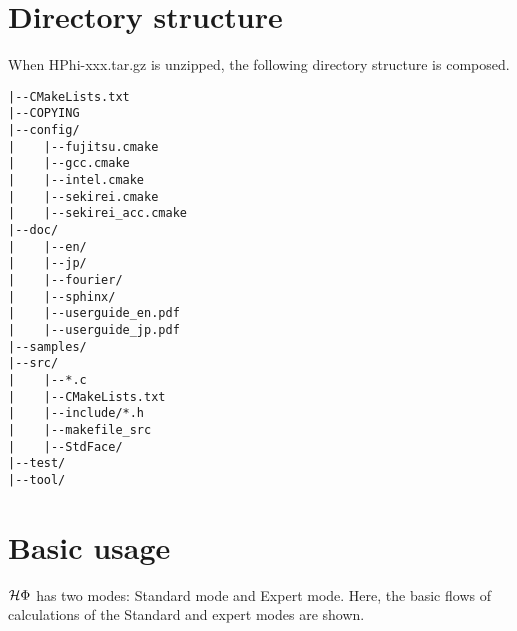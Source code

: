 %
%
%
%
%
%
%
%

\section{Directory structure}
When HPhi-xxx.tar.gz is unzipped, the following directory structure is composed.
 
\begin{verbatim}
|--CMakeLists.txt
|--COPYING
|--config/
|    |--fujitsu.cmake
|    |--gcc.cmake
|    |--intel.cmake
|    |--sekirei.cmake
|    |--sekirei_acc.cmake
|--doc/
|    |--en/
|    |--jp/
|    |--fourier/
|    |--sphinx/
|    |--userguide_en.pdf
|    |--userguide_jp.pdf
|--samples/
|--src/
|    |--*.c
|    |--CMakeLists.txt
|    |--include/*.h
|    |--makefile_src
|    |--StdFace/
|--test/
|--tool/
\end{verbatim}

\section{Basic usage}
$\mathcal{H} \Phi$ has two modes: Standard mode and Expert mode.
Here, the basic flows of calculations of the Standard and expert modes are shown.

